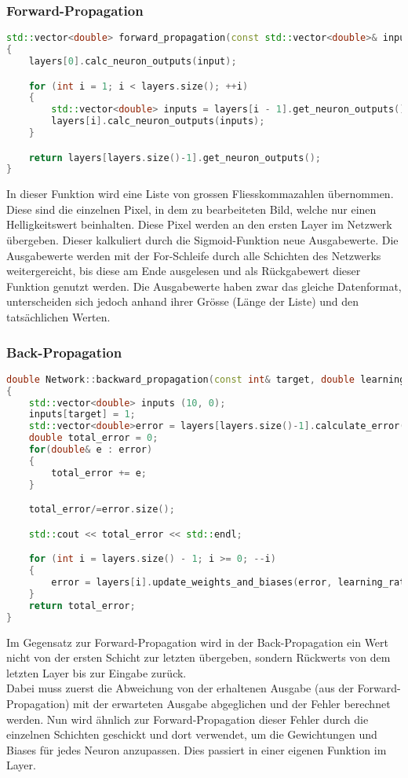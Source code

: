 \subsubsection{Forward-Propagation}
\label{sec:RealForwardPropagationCode}
\begin{lstlisting}[language=c++]
std::vector<double> forward_propagation(const std::vector<double>& input) 
{
	layers[0].calc_neuron_outputs(input);

	for (int i = 1; i < layers.size(); ++i) 
	{
		std::vector<double> inputs = layers[i - 1].get_neuron_outputs();
		layers[i].calc_neuron_outputs(inputs);
	}

	return layers[layers.size()-1].get_neuron_outputs();
}
\end{lstlisting}
In dieser Funktion wird eine Liste von grossen Fliesskommazahlen übernommen. Diese sind die einzelnen Pixel, in dem zu bearbeiteten Bild, welche nur einen Helligkeitswert beinhalten. Diese Pixel werden an den ersten Layer im Netzwerk übergeben. Dieser kalkuliert durch die Sigmoid-Funktion neue Ausgabewerte. Die Ausgabewerte werden mit der For-Schleife durch alle Schichten des Netzwerks weitergereicht, bis diese am Ende ausgelesen und als Rückgabewert dieser Funktion genutzt werden. Die Ausgabewerte haben zwar das gleiche Datenformat, unterscheiden sich jedoch anhand ihrer Grösse (Länge der Liste) und den tatsächlichen Werten.

\subsubsection{Back-Propagation}
\label{sec:RealBackPropagationCode}
\begin{lstlisting}[language=c++]
double Network::backward_propagation(const int& target, double learning_rate) 
{
	std::vector<double> inputs (10, 0);
	inputs[target] = 1;
	std::vector<double>error = layers[layers.size()-1].calculate_error(inputs);
	double total_error = 0;
	for(double& e : error) 
	{
		total_error += e;
	}

	total_error/=error.size();

	std::cout << total_error << std::endl;

	for (int i = layers.size() - 1; i >= 0; --i) 
	{
		error = layers[i].update_weights_and_biases(error, learning_rate);
	}
	return total_error;
}
\end{lstlisting}
Im Gegensatz zur Forward-Propagation wird in der Back-Propagation ein Wert nicht von der ersten Schicht zur letzten übergeben, sondern Rückwerts von dem letzten Layer bis zur Eingabe zurück.
\\ 
Dabei muss zuerst die Abweichung von der erhaltenen Ausgabe (aus der Forward-Propagation) mit der erwarteten Ausgabe abgeglichen und der Fehler berechnet werden. Nun wird ähnlich zur Forward-Propagation dieser Fehler durch die einzelnen Schichten geschickt und dort verwendet, um die Gewichtungen und Biases für jedes Neuron anzupassen. Dies passiert in einer eigenen Funktion im Layer.


